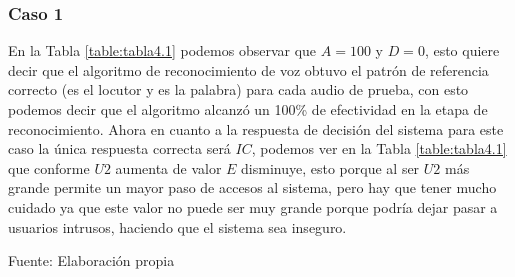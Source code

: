 \subsubsection{Caso 1}
En la Tabla \ref{table:tabla4.1} podemos observar que $A = 100$ y $D = 0$, esto quiere decir que el algoritmo de reconocimiento de voz obtuvo el patrón de referencia correcto (es el locutor y es la palabra) para cada audio de prueba, con esto podemos decir que el algoritmo alcanzó un 100\% de efectividad en la etapa de reconocimiento.
\vskip 0.5cm
Ahora en cuanto a la respuesta de decisión del sistema para este caso la única respuesta correcta será $IC$, podemos ver en la Tabla \ref{table:tabla4.1} que conforme $U2$ aumenta de valor $E$ disminuye, esto porque al ser $U2$ más grande permite un mayor paso de accesos al sistema, pero hay que tener mucho cuidado ya que este valor no puede ser muy grande porque podría dejar pasar a usuarios intrusos, haciendo que el sistema sea inseguro.

\begin{center}
\begin{table}[H]
\centering
\caption{\small{Resultados para obtener U2 en el caso 1.}}
\label{table:tabla4.1}
\vskip 0.2cm
\begin{center}
\vskip 0.2cm
{\small{Fuente: Elaboración propia}}
\end{center}
\end{table}
\end{center}

